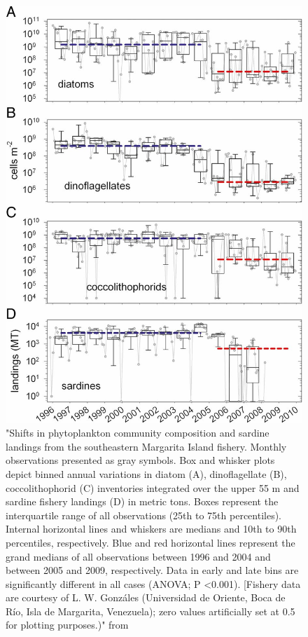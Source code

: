 \begin{figure}
\centering
\includegraphics[trim = 0mm 0mm 0mm 0mm, clip, width=0.7\linewidth]{./Chp2-Pre/Tayloretal2012_F3.large.jpg}
\caption[Scheme]{\small {"Shifts in phytoplankton community composition and sardine landings from the southeastern Margarita Island fishery. Monthly observations presented as gray symbols. Box and whisker plots depict binned annual variations in diatom (A), dinoflagellate (B), coccolithophorid (C) inventories integrated over the upper 55 m and sardine fishery landings (D) in metric tons. Boxes represent the interquartile range of all observations (25th to 75th percentiles). Internal horizontal lines and whiskers are medians and 10th to 90th percentiles, respectively. Blue and red horizontal lines represent the grand medians of all observations between 1996 and 2004 and between 2005 and 2009, respectively. Data in early and late bins are significantly different in all cases (ANOVA; P \textless 0.001). [Fishery data are courtesy of L. W. Gonzáles (Universidad de Oriente, Boca de Río, Isla de Margarita, Venezuela); zero values artificially set at 0.5 for plotting purposes.)" from \citet{Taylor2012}}} %
\label{TaylorSHIFTS}
\end{figure}

